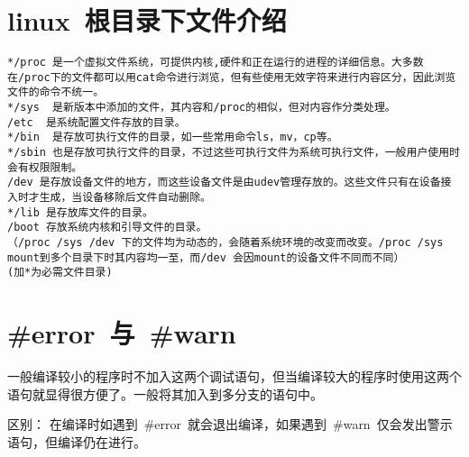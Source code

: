 \section{linux~根目录下文件介绍}
\begin{verbatim}
*/proc 是一个虚拟文件系统，可提供内核,硬件和正在运行的进程的详细信息。大多数在/proc下的文件都可以用cat命令进行浏览，但有些使用无效字符来进行内容区分，因此浏览文件的命令不统一。
*/sys  是新版本中添加的文件，其内容和/proc的相似，但对内容作分类处理。
/etc  是系统配置文件存放的目录。
*/bin  是存放可执行文件的目录，如一些常用命令ls，mv，cp等。
*/sbin 也是存放可执行文件的目录，不过这些可执行文件为系统可执行文件，一般用户使用时会有权限限制。
/dev 是存放设备文件的地方，而这些设备文件是由udev管理存放的。这些文件只有在设备接入时才生成，当设备移除后文件自动删除。
*/lib 是存放库文件的目录。 
/boot 存放系统内核和引导文件的目录。
（/proc /sys /dev 下的文件均为动态的，会随着系统环境的改变而改变。/proc /sys mount到多个目录下时其内容均一至，而/dev 会因mount的设备文件不同而不同）
(加*为必需文件目录)
\end{verbatim}

\section{\#error~与~\#warn}
一般编译较小的程序时不加入这两个调试语句，但当编译较大的程序时使用这两个语句就显得很方便了。一般将其加入到多分支的语句中。

区别：
在编译时如遇到~\#error~就会退出编译，如果遇到~\#warn~仅会发出警示语句，但编译仍在进行。

\iffalse
\section{the process of compile}

\begin{figure}[htbp]
\centering
\begin{tikzpicture}
    \node[box] (c) {.c};
    \node[box] (i) [right=5 of c] {.i};
    \node[box] (s) [right=5 of i] {.S};
    \node[box] (o-c) [right=5 of s] {.o};
    \node[box] (o-a) [above=3 of o-c] {.o};
    \node[box] (elf) [right=5 of o-c] {elf};
    \path (c) edge [arrow] node[auto] {gcc -E} (i)
        (i) edge [arrow] node[auto] {gcc -S} (s)
        (s) edge [arrow] node[auto] {gcc -c} (o-c)
        (o-c) edge [arrow] node[auto] {ld} (elf)
        (o-a.south) [arrow,draw] to node[auto] {} (elf)
        (c) edge [arrow,bloop] (elf);
    \node [below=.8 of s] {gcc -o};
\end{tikzpicture}
\caption{格式转换}
\label{fig:convert_format}
\end{figure}
\fi

